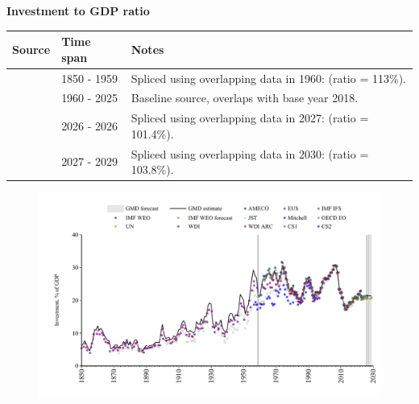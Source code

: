 \documentclass[12pt,a4paper,landscape]{article}
\begin{document}
\begin{adjustbox}{max totalsize={\paperwidth}{\paperheight},center}
\begin{minipage}[t][\textheight][t]{\textwidth}
\vspace*{0.5cm}
{}
\begin{center}
{\Large\bfseries Investment to GDP ratio}
\end{center}
\vspace{0.5cm}
\begin{table}[H]
\centering
\small
\begin{tabular}{|l|l|l|}
\hline
\textbf{Source} & \textbf{Time span} & \textbf{Notes} \\
\hline
\rowcolor{white}\cite{CS2_ESP}& 1850 - 1959 &Spliced using overlapping data in 1960: (ratio = 113\%). \\
\rowcolor{lightgray}\cite{OECD_EO}& 1960 - 2025 &Baseline source, overlaps with base year 2018. \\
\rowcolor{white}\cite{AMECO}& 2026 - 2026 &Spliced using overlapping data in 2027: (ratio = 101.4\%). \\
\rowcolor{lightgray}\cite{IMF_WEO_forecast}& 2027 - 2029 &Spliced using overlapping data in 2030: (ratio = 103.8\%). \\
\hline
\end{tabular}
\end{table}
\begin{figure}[H]
\centering
\includegraphics[width=\textwidth,height=0.6\textheight,keepaspectratio]{graphs/ESP_inv_GDP.pdf}
\end{figure}
\end{minipage}
\end{adjustbox}
\end{document}
